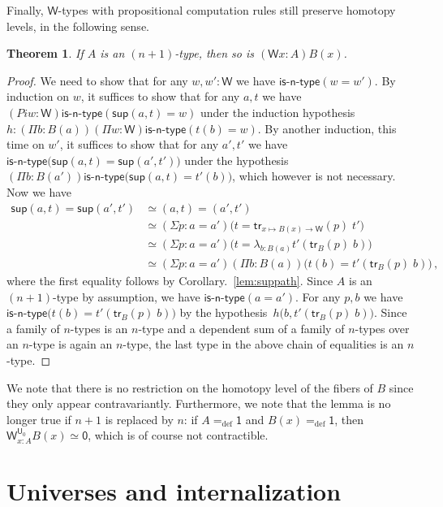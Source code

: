 \documentclass[10pt,a4paper,oneside,reqno]{amsart}
\numberwithin{equation}{section}
\theoremstyle{mythm}
\newtheorem{theorem}{Theorem}[section]
\theoremstyle{mydef}
\theoremstyle{myrmk}
\newcommand{\defeq}{=_{\mathrm{def}}}
\newcommand{\isntype}[1]{\mathsf{is}\text{-}\mathsf{#1}\text{-}\mathsf{type}}
\newcommand{\trans}{\mathsf{tr}}
\newcommand{\lam}[1]{\lambda_{#1}}
\newcommand{\W}{\mathsf{W}}
\newcommand{\wsup}{\mathsf{sup}}
\newcommand{\one}{\mathsf{1}}
\newcommand{\zero}{\mathsf{0}}
\newcommand{\UU}{\mathsf{U}}
\begin{document}
Finally, $\W$-types with propositional computation rules still preserve homotopy levels, in the following sense.

\begin{theorem}
If $A$ is an $(n+1)$-type, then so is $(\W x:A)B(x)$.
\end{theorem}


\begin{proof}
We need to show that for any $w, w' : \W$ we have $\isntype{n}(w = w')$. By induction on $w$, it suffices to show that for any $a,t$ we have $(Pi w:\W) \isntype{n}(\wsup(a,t) = w)$ under the induction hypothesis $h : (\Pi b:B(a)) (\Pi w:\W) \isntype{n}(t(b) = w)$.  By another induction, this time on $w'$, it suffices to show that for any $a',t'$ we have
$\isntype{n}\big(\wsup(a,t) = \wsup(a',t')\big)$ under the hypothesis $(\Pi b:B(a')) \isntype{n}\big(\wsup(a,t) = t'(b)\big)$, which however is not necessary. Now we have
\begin{align*} 
\wsup(a,t) = \wsup(a',t') 
& \simeq (a,t) = (a',t') \\
& \simeq (\Sigma p : a = a') \big(t = \trans_{x \mapsto B(x) \to \W}(p) \; t'\big) \\
& \simeq  (\Sigma p : a = a')  \big(t = \lam{b:B(a)} t'(\trans_B(p) \; b)\big) \\
& \simeq (\Sigma p : a = a') (\Pi b:B(a)) \big(t(b) = t'(\trans_B(p) \; b)\big) \, , 
\end{align*}
where the first equality follows by Corollary.~\ref{lem:suppath}. Since $A$ is an $(n+1)$-type by assumption, we have $\isntype{n}(a=a')$. For any $p,b$ we have $\isntype{n}\big(t(b) = t'(\trans_B(p) \; b)\big)$ by the hypothesis~$h\big(b,t'(\trans_B(p) \; b)\big)$. Since a family of $n$-types is an $n$-type and a dependent sum of a family of $n$-types over an $n$-type is again an $n$-type, the last type in the above chain of equalities is an $n$-type. 
\end{proof}

We note that there is no restriction on the homotopy level of the fibers of $B$ since they only appear contravariantly. Furthermore, we note that the lemma is no longer true if $n+1$ is replaced by $n$: if $A \defeq \one$ and $B(x) \defeq \one$, then $\W^{\UU_0}_{x:A} B(x) \simeq \zero$, which is of course not contractible. 

\section{Universes and internalization}
\end{document}
